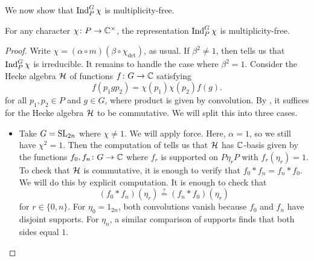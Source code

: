 We now show that $\operatorname{Ind}_P^G\chi$ is multiplicity-free.
\begin{proposition} \label{prop:ind-mult-free}
    For any character $\chi\colon P\to\mathbb C^\times$, the representation $\operatorname{Ind}_P^G\chi$ is multiplicity-free.
\end{proposition}
\begin{proof}
    Write $\chi=(\alpha\circ m)(\beta\circ\chi_{\det})$, as usual. If $\beta^2\ne1$, then  tells us that $\operatorname{Ind}_P^G\chi$ is irreducible. It remains to handle the case where $\beta^2=1$. Consider the Hecke algebra $\mathcal{H}$ of functions $f\colon G\to\mathbb C$ satisfying
    \[f(p_1gp_2)=\chi(p_1)\chi(p_2)f(g).\]
    for all $p_1,p_2\in P$ and $g\in G$, where product is given by convolution. By \cite[Theorem~45.1]{bump-lie-group}, it suffices for the Hecke algebra $\mathcal{H}$ to be commutative. We will split this into three cases.
    \begin{itemize}
        \item Take $G=\mathrm{SL}_{2n}$ where $\chi\ne1$. We will apply force. Here, $\alpha=1$, so we still have $\chi^2=1$. Then the computation of  tells us that $\mathcal{H}$ has $\mathbb C$-basis given by the functions $f_0,f_n\colon G\to\mathbb C$ where $f_r$ is supported on $P\eta_rP$ with $f_r(\eta_r)=1$. To check that $\mathcal{H}$ is commutative, it is enough to verify that $f_0*f_n=f_n*f_0$. We will do this by explicit computation. It is enough to check that
        \[(f_0*f_n)(\eta_r)\stackrel?=(f_n*f_0)(\eta_r)\]
        for $r\in\{0,n\}$. For $\eta_0=1_{2n}$, both convolutions vanish because $f_0$ and $f_n$ have disjoint supports. For $\eta_n$, a similar comparison of supports finds that both sides equal $1$.
        
        

\end{itemize}
\end{proof}
